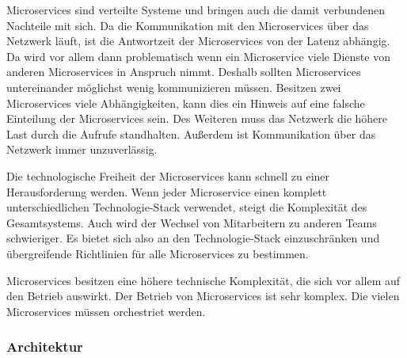 Microservices sind verteilte Systeme und bringen auch die damit verbundenen Nachteile mit sich. Da die Kommunikation mit den Microservices über das Netzwerk läuft, ist die Antwortzeit der Microservices von der Latenz abhängig. Da wird vor allem dann problematisch wenn ein Microservice viele Dienste von anderen Microservices in Anspruch nimmt. Deshalb sollten Microservices untereinander möglichst wenig kommunizieren müssen. Besitzen zwei Microservices viele Abhängigkeiten, kann dies ein Hinweis auf eine falsche Einteilung der Microservices sein. Des Weiteren muss das Netzwerk die höhere Last durch die Aufrufe standhalten. Außerdem ist Kommunikation über das Netzwerk immer unzuverlässig.

Die technologische Freiheit der Microservices kann schnell zu einer Herausforderung werden. Wenn jeder Microservice einen komplett unterschiedlichen Technologie-Stack verwendet, steigt die Komplexität des Gesamtsystems. Auch wird der Wechsel von Mitarbeitern zu anderen Teams schwieriger. Es bietet sich also an den Technologie-Stack einzuschränken und übergreifende Richtlinien für alle Microservices zu bestimmen.

Microservices besitzen eine höhere technische Komplexität, die sich vor allem auf den Betrieb auswirkt.
Der Betrieb von Microservices ist sehr komplex. Die vielen Microservices müssen orchestriet werden.

\subsubsection{Architektur}

